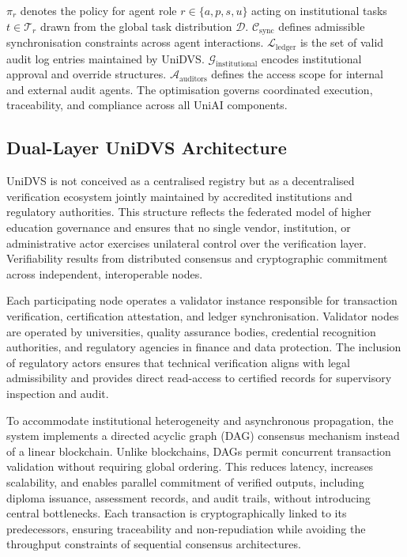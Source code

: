 \documentclass[oneside,10pt]{swissi}
\begin{document}
$\pi_r$ denotes the policy for agent role $r \in \{a, p, s, u\}$ acting on institutional tasks $t \in \mathcal{T}_r$ drawn from the global task distribution $\mathcal{D}$. $\mathcal{C}_{\text{sync}}$ defines admissible synchronisation constraints across agent interactions. $\mathcal{L}_{\text{ledger}}$ is the set of valid audit log entries maintained by UniDVS. $\mathcal{G}_{\text{institutional}}$ encodes institutional approval and override structures. $\mathcal{A}_{\text{auditors}}$ defines the access scope for internal and external audit agents. The optimisation governs coordinated execution, traceability, and compliance across all UniAI components.

\subsection{Dual-Layer UniDVS Architecture}

UniDVS is not conceived as a centralised registry but as a decentralised verification ecosystem jointly maintained by accredited institutions and regulatory authorities. This structure reflects the federated model of higher education governance and ensures that no single vendor, institution, or administrative actor exercises unilateral control over the verification layer. Verifiability results from distributed consensus and cryptographic commitment across independent, interoperable nodes.

Each participating node operates a validator instance responsible for transaction verification, certification attestation, and ledger synchronisation. Validator nodes are operated by universities, quality assurance bodies, credential recognition authorities, and regulatory agencies in finance and data protection. The inclusion of regulatory actors ensures that technical verification aligns with legal admissibility and provides direct read-access to certified records for supervisory inspection and audit.

To accommodate institutional heterogeneity and asynchronous propagation, the system implements a directed acyclic graph (DAG) consensus mechanism instead of a linear blockchain. Unlike blockchains, DAGs permit concurrent transaction validation without requiring global ordering. This reduces latency, increases scalability, and enables parallel commitment of verified outputs, including diploma issuance, assessment records, and audit trails, without introducing central bottlenecks. Each transaction is cryptographically linked to its predecessors, ensuring traceability and non-repudiation while avoiding the throughput constraints of sequential consensus architectures.
\end{document}
